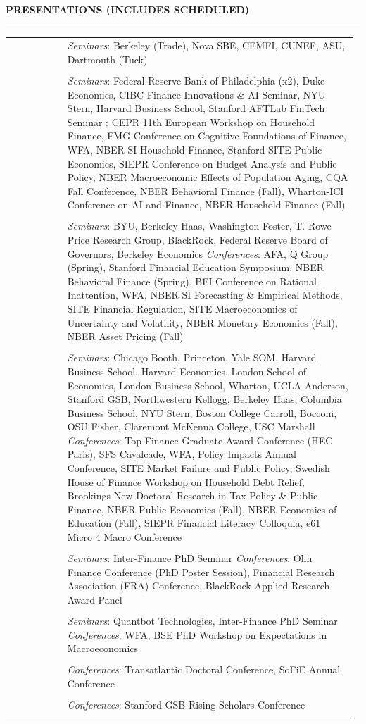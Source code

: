 \documentclass[a4paper, 10pt]{article}
\makeatletter
\newcommand{\cvsec}[1]
{
	\needspace{4\baselineskip}
	\noindent \textbf{#1}
	
	\vspace{2pt}
	
	\hrule
	
	\bigskip
}
\newcommand{\cvitem}[2]{#1 & #2 \\ & \\}
\newenvironment{cvchrono}[1]
{
	\cvsec{#1}
	\begin{longtable}{@{}>{\raggedright\arraybackslash}p{0.16\linewidth}@{\hspace{0.02\linewidth}}>{\raggedright\arraybackslash}p{0.82\linewidth}@{}}
}
{
	\end{longtable}
}
\makeatother
\begin{document}
\begin{cvchrono}{PRESENTATIONS (INCLUDES SCHEDULED)}
	\cvitem{2027}{{\itshape Seminars}: Berkeley (Trade), Nova SBE, CEMFI, CUNEF, ASU, Dartmouth (Tuck)}
		\cvitem{2026}{{\itshape Seminars}: Federal Reserve Bank of Philadelphia (x2), Duke Economics, CIBC Finance Innovations \& AI Seminar, NYU Stern, Harvard Business School, Stanford AFTLab FinTech Seminar \newline {\itshape Conferences}: CEPR 11th European Workshop on Household Finance, FMG Conference on Cognitive Foundations of Finance, WFA, NBER SI Household Finance, Stanford SITE Public Economics, SIEPR Conference on Budget Analysis and Public Policy, NBER Macroeconomic Effects of Population Aging, CQA Fall Conference, NBER Behavioral Finance (Fall), Wharton-ICI Conference on AI and Finance, NBER Household Finance (Fall)}
	\cvitem{2025}{\textit{Seminars}: BYU, Berkeley Haas, Washington Foster, T. Rowe Price Research Group, BlackRock, Federal Reserve Board of Governors, Berkeley Economics  \newline \textit{Conferences}: AFA, Q Group (Spring), Stanford Financial Education Symposium, NBER Behavioral Finance (Spring), BFI Conference on Rational Inattention, WFA, NBER SI Forecasting \& Empirical Methods, SITE Financial Regulation, SITE Macroeconomics of Uncertainty and Volatility, NBER Monetary Economics (Fall), NBER Asset Pricing (Fall)}
	\cvitem{2024}{\textit{Seminars}: Chicago Booth, Princeton, Yale SOM, Harvard Business School, Harvard Economics, London School of Economics, London Business School, Wharton, UCLA Anderson, Stanford GSB, Northwestern Kellogg, Berkeley Haas, Columbia Business School, NYU Stern, Boston College Carroll, Bocconi, OSU Fisher, Claremont McKenna College, USC Marshall \newline \textit{Conferences}: Top Finance Graduate Award Conference (HEC Paris), SFS Cavalcade, WFA, Policy Impacts Annual Conference, SITE Market Failure and Public Policy, Swedish House of Finance Workshop on Household Debt Relief, Brookings New Doctoral Research in Tax Policy \& Public Finance, NBER Public Economics (Fall), NBER Economics of Education (Fall), SIEPR Financial Literacy Colloquia, e61 Micro 4 Macro Conference}
	\cvitem{2023}{\textit{Seminars}: Inter-Finance PhD Seminar \newline \textit{Conferences}: Olin Finance Conference (PhD Poster Session), Financial Research Association (FRA) Conference, BlackRock Applied Research Award Panel}
	\cvitem{2022}{\textit{Seminars}: Quantbot Technologies, Inter-Finance PhD Seminar \newline \textit{Conferences}: WFA, BSE PhD Workshop on Expectations in Macroeconomics}
	\cvitem{2021}{\textit{Conferences}: Transatlantic Doctoral Conference, SoFiE Annual Conference}
	\cvitem{2020}{\textit{Conferences}: Stanford GSB Rising Scholars Conference}
\end{cvchrono}
\end{document}
